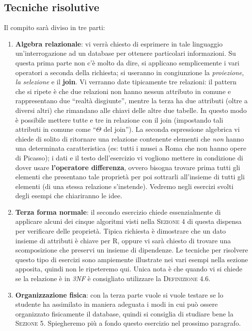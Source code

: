 \subsection{Tecniche risolutive}
Il compito sarà diviso in tre parti:
\begin{enumerate}
 \item \textbf {Algebra relazionale}: vi verrà chiesto di esprimere in tale linguaggio
 un'interrogazione ad un database per ottenere particolari informazioni. Su questa prima parte
 non c'è molto da dire, si applicano semplicemente i vari operatori a seconda della richiesta; 
 si useranno in congiunzione la \emph{proiezione}, \emph{la selezione} e il \textbf{join}. 
 Vi verranno date tipicamente tre relazioni: il pattern che si ripete
 è che due relazioni non hanno nessun attributo in comune e rappresentano due ``realtà 
 disgiunte'', mentre la terza ha due attributi (oltre a diversi altri) che rimandano alle chiavi 
 delle altre due tabelle. In questo modo è possibile mettere tutte e tre in relazione con il join 
 (impostando tali attributi in comune come ``$\Theta$ del join''). La seconda espressione algebrica
 vi chiede di solito di ritornare una relazione contenente elementi che \emph{non} hanno una 
 determinata caratteristica (es: tutti i musei a Roma che non hanno opere di Picasso); i dati e il 
 testo dell'esercizio vi vogliono mettere in condizione di dover usare \textbf{l'operatore differenza},
 ovvero bisogna trovare prima tutti gli elementi che presentano tale proprietà per poi sottrarli 
 all'insieme di tutti gli elementi (di una stessa relazione s'instende). Vedremo negli esercizi 
 svolti degli esempi che chiariranno le idee.
 \item \textbf {Terza forma normale}: il secondo esercizio chiede essenzialmente di applicare 
 alcuni dei cinque algoritmi visti nella \textsc{Sezione 4} di questa dispensa per verificare 
 delle proprietà. Tipica richiesta è dimostrare che un dato insieme di attributi è chiave per R, 
 oppure vi sarà chiesto di trovare una scomposizione che preservi un insieme di dipendenze. Le 
 tecniche per risolvere questo tipo di esercizi sono ampiemente illustrate nei vari esempi nella 
 sezione apposita, quindi non le ripeteremo qui. Unica nota è che quando vi si chiede se la 
 relazione è in \emph{3NF} è consigliato utilizzare la \textsc{Definizione 4.6}.
 \item \textbf{Organizzazione fisica}: con la terza parte vuole si vuole testare se lo studente ha
 assimilato in maniera adeguata i modi in cui può ossere organizzato fisicamente il database, quindi 
 si consiglia di studiare bene la \textsc{Sezione 5}. Spiegheremo più a fondo questo esercizio nel 
 prossimo paragrafo.
\end{enumerate}

